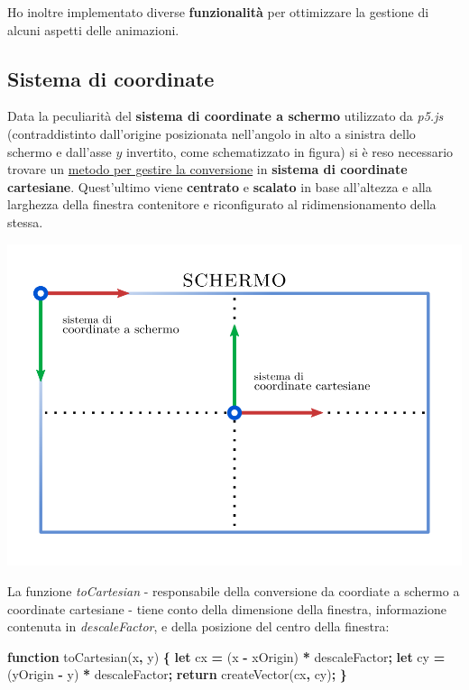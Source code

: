 \documentclass[
]{book}
\newenvironment{Shaded}{\begin{snugshade}}{\end{snugshade}}
\newcommand{\AttributeTok}[1]{\textcolor[rgb]{0.77,0.63,0.00}{#1}}
\newcommand{\ControlFlowTok}[1]{\textcolor[rgb]{0.13,0.29,0.53}{\textbf{#1}}}
\newcommand{\KeywordTok}[1]{\textcolor[rgb]{0.13,0.29,0.53}{\textbf{#1}}}
\newcommand{\NormalTok}[1]{#1}
\newcommand{\OperatorTok}[1]{\textcolor[rgb]{0.81,0.36,0.00}{\textbf{#1}}}
\begin{document}
Ho inoltre implementato diverse \textbf{funzionalità} per ottimizzare la gestione di alcuni aspetti delle animazioni.

\hypertarget{coordsystem}{%
\subsection{Sistema di coordinate}\label{coordsystem}}

Data la peculiarità del \textbf{sistema di coordinate a schermo} utilizzato da \emph{p5.js} (contraddistinto dall'origine posizionata nell'angolo in alto a sinistra dello schermo e dall'asse \(y\) invertito, come schematizzato in figura) si è reso necessario trovare un \href{https://github.com/Bradwave/thesis/blob/master/animations/js/utils/coordinateSystem.js}{metodo per gestire la conversione} in \textbf{sistema di coordinate cartesiane}. Quest'ultimo viene \textbf{centrato} e \textbf{scalato} in base all'altezza e alla larghezza della finestra contenitore e riconfigurato al ridimensionamento della stessa.

\begin{center}\includegraphics[width=0.6\linewidth]{_images/screen} \end{center}

La funzione \emph{toCartesian} - responsabile della conversione da coordiate a schermo a coordinate cartesiane - tiene conto della dimensione della finestra, informazione contenuta in \emph{descaleFactor}, e della posizione del centro della finestra:

\begin{Shaded}
\begin{Highlighting}[]
\KeywordTok{function} \AttributeTok{toCartesian}\NormalTok{(x}\OperatorTok{,}\NormalTok{ y) }\OperatorTok{\{}
  \KeywordTok{let}\NormalTok{ cx }\OperatorTok{=}\NormalTok{ (x }\OperatorTok{-}\NormalTok{ xOrigin) }\OperatorTok{*}\NormalTok{ descaleFactor}\OperatorTok{;}
  \KeywordTok{let}\NormalTok{ cy }\OperatorTok{=}\NormalTok{ (yOrigin }\OperatorTok{-}\NormalTok{ y) }\OperatorTok{*}\NormalTok{ descaleFactor}\OperatorTok{;}
  \ControlFlowTok{return} \AttributeTok{createVector}\NormalTok{(cx}\OperatorTok{,}\NormalTok{ cy)}\OperatorTok{;}
\OperatorTok{\}}
\end{Highlighting}
\end{Shaded}
\end{document}

